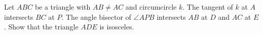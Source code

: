 Let $ABC$ be a triangle with $AB \neq AC$ and circumcircle $k$. The tangent of $k$ at $A$ intersects $BC$ at $P$. The angle bisector of $\angle APB$ intersects $AB$ at $D$ and $AC$ at $E$. Show that the triangle $ADE$ is isosceles.